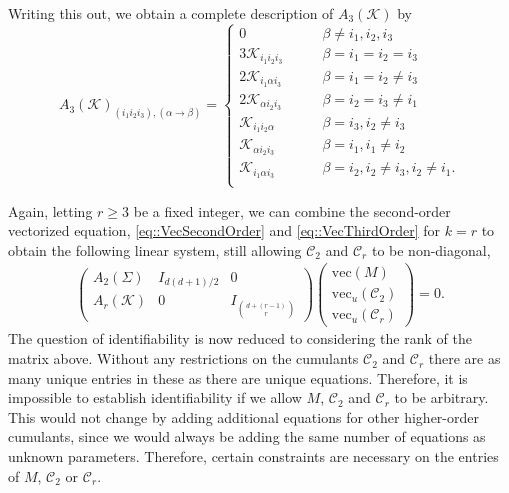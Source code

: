 \documentclass{biometrika}
\begin{document}
Writing this out, we obtain a complete description of $A_3(\mathcal{K} )$ by
\begin{equation}
\label{eq::GeneralA3}
    A_3(\mathcal{K} )_{(i_1i_2i_3), (\alpha \rightarrow \beta)} = 
    \begin{cases}
         0 & \qquad  \beta \neq i_1, i_2, i_3 \\ 
         3 \mathcal{K} _{i_1 i_2 i_3}  & \qquad \beta = i_1 = i_2 = i_3 \\ 
         2\mathcal{K}_{i_1 \alpha i_3} & \qquad  \beta = i_1 = i_2 \neq i_3 \\ 
         2\mathcal{K} _{ \alpha i_2 i_3} &  \qquad \beta = i_2 = i_3 \neq i_1 \\ 
         \mathcal{K} _{i_1 i_2 \alpha } & \qquad \beta = i_3, i_2 \neq i_3\\
         \mathcal{K} _{\alpha i_2 i_3} & \qquad \beta = i_1, i_1 \neq i_2\\
         \mathcal{K} _{i_1 \alpha i_3} & \qquad \beta = i_2, i_2 \neq i_3, i_2 \neq i_1. \\ 
    \end{cases}
\end{equation}

    Again, letting $r \geq 3$ be a fixed integer, we can combine the second-order vectorized equation, \eqref{eq::VecSecondOrder} and \eqref{eq::VecThirdOrder} for $k = r$ to obtain the following linear system, still allowing $\mathcal{C}_2$ and $\mathcal{C}_r$ to be non-diagonal,
    \begin{align}
    \label{eq::BigLinSys}
        \begin{pmatrix}
            A_2(\Sigma) & I_{d(d+1)/2} & 0 \\ 
            A_r(\mathcal{K} ) & 0 & I_{\binom{d+(r-1)}{r}} 
        \end{pmatrix} 
        \begin{pmatrix}
            \mathrm{vec}(M) \\ 
            \mathrm{vec}_u(\mathcal{C}_2)\\
            \mathrm{vec}_u(\mathcal{C}_r)
        \end{pmatrix} = 0.
    \end{align}
   The question of identifiability is now reduced to considering the rank of the matrix above.  
   Without any restrictions on the cumulants $\mathcal{C}_2$ and $\mathcal{C}_r$ there are 
   as many unique entries in these as there are unique equations. Therefore, it is impossible to 
   establish identifiability if we allow $M$, $\mathcal{C}_2$ and $\mathcal{C}_r$ to be arbitrary. 
   This would not change by adding additional equations for other higher-order cumulants, since we would always be adding the same number of equations as unknown parameters. Therefore, certain constraints
   are necessary on the entries of $M$, $\mathcal{C}_2$ or $\mathcal{C}_r$. 
   
\end{document}
